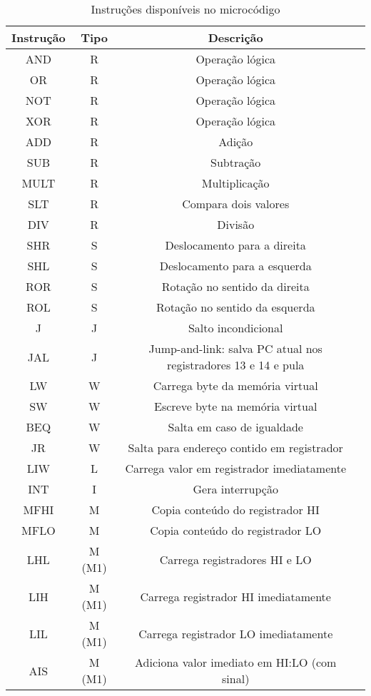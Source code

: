 \begin{table}[H]
\caption{Instruções disponíveis no microcódigo}
\label{tab:inst}
\begin{tabular}{c c c c}
\hline
Instrução	&	Tipo		&	Descrição\\
\hline
AND			&	R		&	Operação lógica\\
OR			&	R		&	Operação lógica\\
NOT			&	R		&	Operação lógica\\
XOR			&	R		&	Operação lógica\\
ADD			&	R		&	Adição\\
SUB			&	R		&	Subtração\\
MULT			&	R		&	Multiplicação\\
SLT			&	R		&	Compara dois valores\\
DIV			&	R		&	Divisão\\
\hline
SHR			&	S		&	Deslocamento para a direita\\
SHL			&	S		&	Deslocamento para a esquerda\\
ROR			&	S		&	Rotação no sentido da direita\\
ROL			&	S		&	Rotação no sentido da esquerda\\
\hline
J			&	J		&	Salto incondicional\\
JAL			&	J		&	Jump-and-link: salva PC atual nos registradores 13 e 14 e pula\\
\hline
LW			&	W		&	Carrega byte da memória virtual\\
SW			&	W		&	Escreve byte na memória virtual\\
BEQ			&	W		&	Salta em caso de igualdade\\
JR			&	W		&	Salta para endereço contido em registrador\\
\hline
LIW			&	L		&	Carrega valor em registrador imediatamente\\
\hline
INT			&	I		&	Gera interrupção\\
\hline
MFHI			&	M		&	Copia conteúdo do registrador HI\\
MFLO			&	M		&	Copia conteúdo do registrador LO\\
LHL			&	M (M1)	&	Carrega registradores HI e LO\\
LIH			&	M (M1)	&	Carrega registrador HI imediatamente\\
LIL			&	M (M1)	&	Carrega registrador LO imediatamente\\
AIS			&	M (M1)	&	Adiciona valor imediato em HI:LO (com sinal)\\
\end{tabular}
\end{table}

